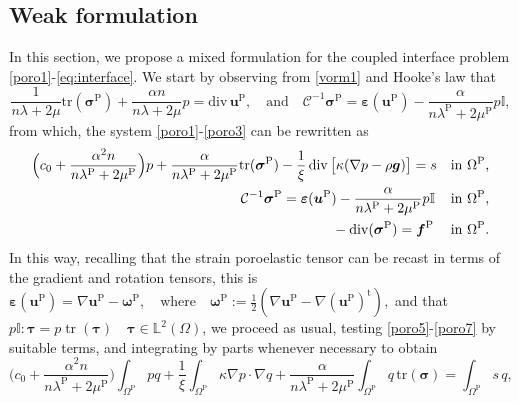 \documentclass[11pt]{article}
\numberwithin{equation}{section}
\newcommand{\tr}{\operatorname*{tr}}
\newcommand{\vdiv}{\operatorname*{div}}
\def\b{\boldsymbol}
\newcommand\ff{\boldsymbol{f}}
\newcommand\OmP{\Omega^{\mathrm{P}}}
\numberwithin{equation}{section}
\begin{document}
	\subsection{Weak formulation}
	In this section, we propose a mixed formulation for the coupled interface problem \eqref{poro1}-\eqref{eq:interface}. We start by observing from \eqref{vorm1} and Hooke's law that $$\frac{1}{n\lambda + 2\mu}\mathrm{tr}(\b \sigma^{\mathrm{P}})+\frac{\alpha n}{n\lambda+2\mu}p = \mathrm{div}\,\b u^{\mathrm{P}}, \quad \mathrm{and}\quad \mathcal{C}^{-1}\b \sigma^{\mathrm{P}}=\b \varepsilon(\b u^{\mathrm{P}})-\frac{\alpha}{n\lambda^{\mathrm{P}}+2\mu^{\mathrm{P}}}p\mathbb{I},$$
	from which, the system \eqref{poro1}-\eqref{poro3} can be rewritten  as   
	\begin{align}
	&\Big(c_0+\frac{\alpha^2n}{n\lambda^{\mathrm{P}}+2\mu^{\mathrm{P}}}\Big)p + \frac{\alpha}{n\lambda^{\mathrm{P}}+2\mu^{\mathrm{P}}}\mathrm{tr}(\b \sigma^{\mathrm{P}})- \frac{1}{\xi}\vdiv \big{[}\kappa(\nabla p
	- \rho \boldsymbol{g})\big{]}
	= s&  \text{in $\OmP$,}   \label{poro5}\\
	&\qquad \qquad \qquad \qquad \qquad \qquad \qquad\quad  \mathcal{C}^{-1}\b \sigma^{\mathrm{P}}=\b \varepsilon(\b u^{\mathrm{P}})-\frac{\alpha}{n\lambda^{\mathrm{P}}+2\mu^{\mathrm{P}}}p\mathbb{I}& \text{in $\OmP$,} \label{poro6} \\
	&\qquad \qquad \qquad \quad\;\; \qquad\qquad \qquad\qquad \qquad \qquad \qquad-\vdiv(\b \sigma^{\mathrm{P}})  = \ff^{\mathrm{P}}  & \text{in $\OmP$}. \label{poro7}
	\end{align}
	In this way, recalling that the strain poroelastic tensor can be recast in terms of the gradient and rotation tensors, this is $\b \varepsilon(\b u^{\mathrm{P}})=\nabla\b u^{\mathrm{P}}-\b \omega^{\mathrm{P}},\quad \text{where}\quad \b \omega^{\mathrm{P}}:=\frac{1}{2}(\nabla\b u^{\mathrm{P}}-\nabla ({\b u^{\mathrm{P}}})^{\mathrm{t}}),$ and that $p\mathbb{I}\colon \b \tau = p\tr(\b \tau )\quad \b \tau \in \mathbb{L}^2(\Omega)$, we proceed as usual, testing \eqref{poro5}-\eqref{poro7} by suitable terms, and integrating by parts whenever necessary to obtain 
	\begin{equation}\label{eq:poro-equil}
	\Big(c_0+\frac{\alpha^2n}{n\lambda^{\mathrm{P}}+2\mu^{\mathrm{P}}}\Big)\int_{\OmP}p q+\frac{1}{\xi}\int_{\Omega^{\mathrm{P}}}\kappa\nabla p\cdot \nabla q +\frac{\alpha}{n\lambda^{\mathrm{P}}+2\mu^{\mathrm{P}}} \int_{\OmP} q\,\mathrm{tr}(\b \sigma)=\int_{\OmP}s\,q,
	\end{equation}
\end{document}
